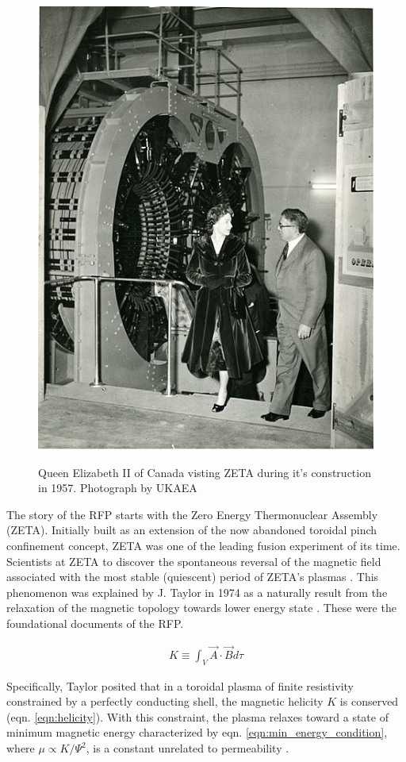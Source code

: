\begin{refsection}
\begin{figure}[!htb]
	\centering
	\includegraphics[width = 0.75\linewidth]{./1_Introduction/queen_at_zeta.jpg}
    \label{fig:Queen_at_ZETA}
    \caption[Queen Elizabeth II at the ZETA experiment]{Queen Elizabeth II of Canada visting ZETA during it's construction in 1957. Photograph by UKAEA}
\end{figure}%

The story of the RFP starts with the Zero Energy Thermonuclear Assembly (ZETA). Initially built as an extension of the now abandoned toroidal pinch confinement concept, ZETA was one of the leading fusion experiment of its time. Scientists at ZETA to discover the spontaneous reversal of the magnetic field associated with the most stable (quiescent) period of ZETA's plasmas \cite{Butt_IAEA66,Robinson_IAEA69}. This phenomenon was explained by J. Taylor in 1974 as a naturally result from the relaxation of the magnetic topology towards lower energy state \cite{Taylor74}. These were the foundational documents of the RFP.

\begin{align}\label{eqn:helicity}
	K \equiv \int_{V} \vec{A} \cdot \vec{B} d\tau
\end{align}

Specifically, Taylor posited that in a toroidal plasma of finite resistivity constrained by a perfectly conducting shell, the magnetic helicity $K$ is conserved (eqn. \ref{eqn:helicity}). With this constraint, the plasma relaxes toward a state of minimum magnetic energy characterized by eqn. \ref{eqn:min_energy_condition}, where $\mu \varpropto K/ \Psi ^2$, is a constant unrelated to permeability . 


\end{refsection}
